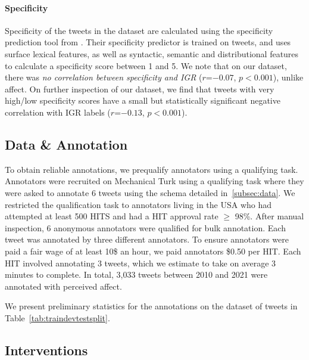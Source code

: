 \paragraph{Specificity} Specificity of the tweets in the dataset are calculated using the specificity  prediction tool from \citet{gao_predicting_2019}. Their specificity predictor is trained on tweets, and uses surface lexical features, as well as syntactic, semantic and distributional features to calculate a specificity score between 1 and 5. We note that on our dataset, there was \emph{no correlation between specificity and IGR} ($r$=$-0.07$, $p<0.001$), unlike affect. On further inspection of our dataset, we find that tweets with very high/low specificity scores \citep[gathered by excluding specificity scores between 3 and 4, similar to excluding the middle in][]{gelman2009} have a small but statistically significant negative correlation with IGR labels ($r$=$-0.13$, $p<0.001$).

\subsection{Data \& Annotation}
\label{subsec:probing-data}



To obtain reliable annotations, we prequalify annotators using a qualifying task. Annotators were recruited on Mechanical Turk using a qualifying task where they were asked to annotate 6 tweets using the schema detailed in\textsection~\ref{subsec:data}. We restricted the qualification task to annotators living in the USA who had attempted at least 500 HITS and had a HIT approval rate $\geq$ 98\%. After manual inspection, 6 anonymous annotators were qualified for bulk annotation. Each tweet was annotated by three different annotators. To ensure annotators were paid a fair wage of at least 10\$ an hour, we paid annotators \$0.50 per HIT. Each HIT involved annotating 3 tweets, which we estimate to take on average 3 minutes to complete.  In total, 3,033 tweets between 2010 and 2021 were annotated with perceived affect.

We present preliminary statistics for the annotations on the dataset of tweets in Table~\ref{tab:traindevtestsplit}.

\subsection{Interventions}
\label{subsec:interventions}


